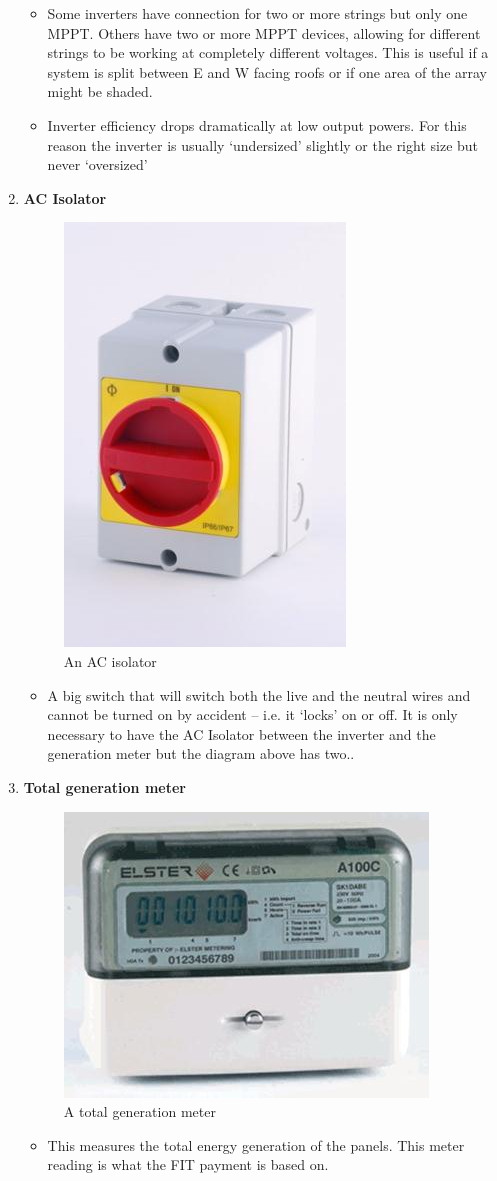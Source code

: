 \documentclass{article}
\begin{document}
\begin{enumerate}
\begin{itemize}
\item	Some inverters have connection for two or more strings but only one MPPT. Others have two or more MPPT devices, allowing for different strings to be working at completely different voltages. This is useful if a system is split between E and W facing roofs or if one area of the array might be shaded.
\item	Inverter efficiency drops dramatically at low output powers. For this reason the inverter is usually ‘undersized’ slightly or the right size but never ‘oversized’
\end{itemize}
\item \textbf{AC Isolator}
\begin{figure}[h]
\centering
\includegraphics[width=0.25\linewidth]{../figures/AC-isolator.jpg}
\caption{An AC isolator}
\label{fig:AC-isolator}
\end{figure}
\begin{itemize}
\item A big switch that will switch both the live and the neutral wires and cannot be turned on by accident – i.e. it ‘locks’ on or off. It is only necessary to have the AC Isolator between the inverter and the generation meter but the diagram above has two..
\end{itemize}
\item \textbf{Total generation meter}
\begin{figure}[ht]
\centering
\includegraphics[width=0.25\linewidth]{../figures/TGM.jpg}
\caption{A total generation meter}
\label{fig:TGM}
\end{figure}
\begin{itemize}
\item This measures the total energy generation of the panels. This meter reading is what the FIT payment is based on.

\end{itemize}
\end{enumerate}
\end{document}
